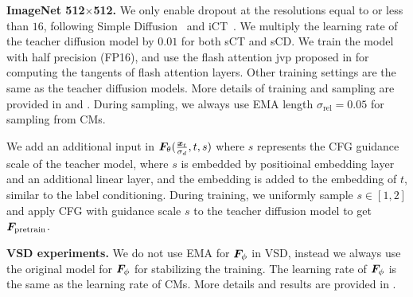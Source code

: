 \textbf{ImageNet 512$\times$512. }
We only enable dropout at the resolutions equal to or less than $16$, following Simple Diffusion~\citep{hoogeboom2023simple} and iCT~\citep{song2023ict}. We multiply the learning rate of the teacher diffusion model by $0.01$ for both sCT and sCD. We train the model with half precision (FP16), and use the flash attention jvp proposed in  for computing the tangents of flash attention layers. Other training settings are the same as the teacher diffusion models. More details of training and sampling are provided in  and . During sampling, we always use EMA length $\sigma_{\text{rel}}=0.05$ for sampling from CMs.

We add an additional input in ${\bm{F}}_\theta(\frac{{\bm{x}}_t}{\sigma_d},t,s)$ where $s$ represents the CFG guidance scale of the teacher model, where $s$ is embedded by positioinal embedding layer and an additional linear layer, and the embedding is added to the embedding of $t$, similar to the label conditioning. During training, we uniformly sample $s\in[1,2]$ and apply CFG with guidance scale $s$ to the teacher diffusion model to get ${\bm{F}}_{\text{pretrain}}$.

\textbf{VSD experiments. }
We do not use EMA for ${\bm{F}}_\phi$ in VSD, instead we always use the original model for ${\bm{F}}_\phi$ for stabilizing the training. The learning rate of ${\bm{F}}_\phi$ is the same as the learning rate of CMs. More details and results are provided in .


